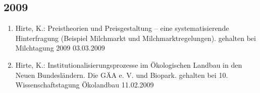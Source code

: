 \subsection*{2009}
\begin{enumerate}
	\item Hirte, K.: Preistheorien und Preisgestaltung – eine systematisierende Hinterfragung (Beispiel Milchmarkt und Milchmarktregelungen). gehalten bei Milchtagung 2009 03.03.2009
	\item Hirte, K.: Institutionalisierungsprozesse im Ökologischen Landbau in den Neuen Bundesländern. Die GÄA e. V. und Biopark. gehalten bei 10. Wissenschaftstagung Ökolandbau 11.02.2009
\end{enumerate}
